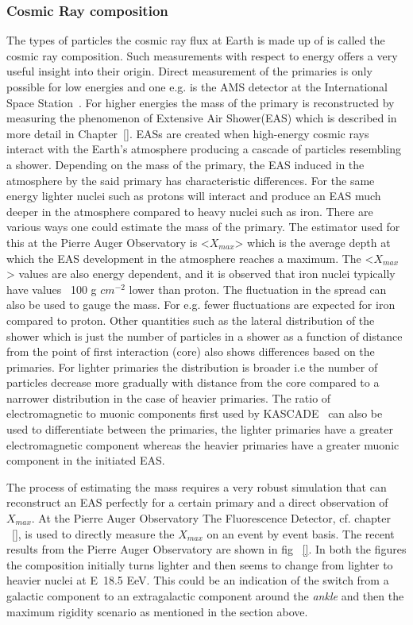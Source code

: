 \subsubsection*{Cosmic Ray composition}
\label{subsubsec:CRcompo}
The types of particles the cosmic ray flux at Earth is made up of is called the cosmic ray composition. Such measurements with respect to energy offers a very useful insight into their origin. Direct measurement of the primaries is only possible for low energies and one e.g. is the AMS detector at the International Space Station~\cite{}. For higher energies the mass of the primary is reconstructed by measuring the phenomenon of Extensive Air Shower(EAS) which is described in more detail in Chapter~\ref{}. EASs are created when high-energy cosmic rays interact with the Earth's atmosphere producing a cascade of particles resembling a shower.  Depending on the mass of the primary, the EAS induced in the atmosphere by the said primary has characteristic differences. For the same energy lighter nuclei such as protons will interact and produce an EAS much deeper in the atmosphere compared to heavy nuclei such as iron. There are various ways one could estimate the mass of the primary. The estimator used for this at the Pierre Auger Observatory is <$X_{max}$> which is the average depth at which the EAS development in the atmosphere reaches a maximum. The <$X_{max}$> values are also energy dependent, and it is observed that iron nuclei typically have values ~100 g $cm^{-2}$ lower than proton. The fluctuation in the spread can also be used to gauge the mass. For e.g. fewer fluctuations are expected for iron compared to proton. Other quantities such as the lateral distribution of the shower which is just the number of particles in a shower as a function of distance from the point of first interaction (core) also shows differences based on the primaries. For lighter primaries the distribution is broader i.e the number of particles decrease more gradually with distance from the core compared to a narrower distribution in the case of heavier primaries. The ratio of electromagnetic to muonic components first used by KASCADE~\cite{} can also be used to differentiate between the primaries, the lighter primaries have a greater electromagnetic component whereas the heavier primaries have a greater muonic component in the initiated EAS.    

The process of estimating the mass requires a very robust simulation that can reconstruct an EAS perfectly for a certain primary and a direct observation of $X_{max}$. At the Pierre Auger Observatory The Fluorescence Detector, cf. chapter ~\ref{}, is used to directly measure the $X_{max}$ on an event by event basis. The recent results from the Pierre Auger Observatory are shown in fig ~\ref{}. In both the figures the composition initially turns lighter and then seems to change from lighter to heavier nuclei at E~18.5 EeV. This could be an indication of the switch from a galactic component to an extragalactic component around the \textit{ankle} and then the maximum rigidity scenario as mentioned in the section above.


